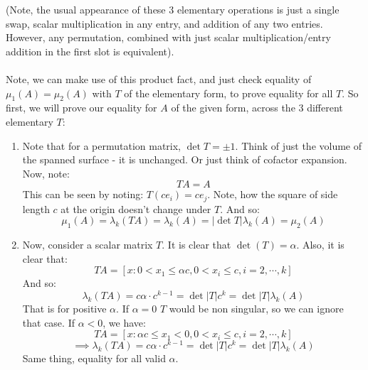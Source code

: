 \documentclass[12pt,a4paper]{article}
\newcommand{\1}[1]{\mathbbm{1}\left\{ #1 \right\}}
\begin{document}
(Note, the usual appearance of these 3 elementary operations is just a single swap, scalar multiplication in any entry, and addition of any two entries. However, any permutation, combined with just scalar multiplication/entry addition in the first slot is equivalent).
\\\\
Note, we can make use of this product fact, and just check equality of $\mu_1(A) = \mu_2(A)$ with $T$ of the elementary form, to prove equality for all $T$. So first, we will prove our equality for $A$ of the given form, across the 3 different elementary $T$:
\begin{enumerate}
	\item Note that for a permutation matrix, $\det T = \pm 1$. Think of just the volume of the spanned surface - it is unchanged. Or just think of cofactor expansion. Now, note:
	$$
		TA = A
	$$
	This can be seen by noting: $T(ce_i) = ce_j$. Note, how the square of side length $c$ at the origin doesn't change under $T$. And so:
	$$
		\mu_1(A) = \lambda_k(TA) = \lambda_k(A) = |\det T| \lambda_k(A) = \mu_2(A)
	$$
	
	\item Now, consider a scalar matrix $T$. It is clear that $\det(T) = \alpha$. Also, it is clear that:
	$$
		TA = [x: 0 < x_1 \leq \alpha c, 0 < x_i \leq c, i = 2, \cdots, k]
	$$
	And so:
	$$
		\lambda_k(TA) = c\alpha \cdot c^{k-1} =
		\det|T| c^k = \det|T| \lambda_k(A)
	$$
	That is for positive $\alpha$. If $\alpha = 0$ $T$ would be non singular, so we can ignore that case. If $\alpha < 0$, we have:
	$$
		TA = [x: \alpha c \leq x_1 < 0, 0 < x_i \leq c, i = 2, \cdots, k]
	$$
	$$
		\implies \lambda_k(TA) = c\alpha \cdot c^{k-1} =
		\det|T| c^k = \det|T| \lambda_k(A)
	$$
	Same thing, equality for all valid $\alpha$.
	

\end{enumerate}
\end{document}
